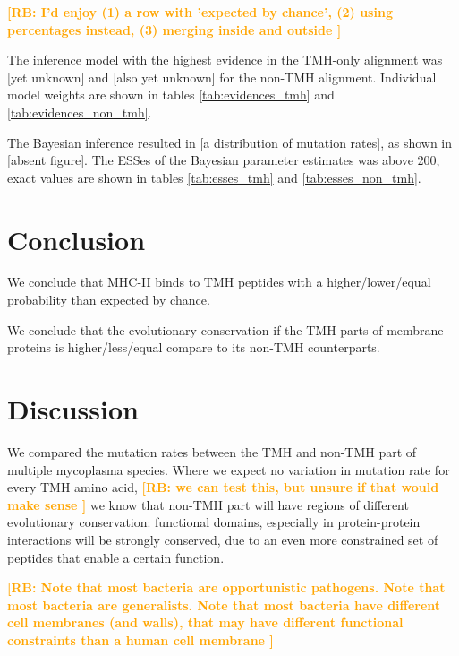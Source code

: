 \documentclass{article}
\newcommand{\richel}[1]{\textcolor{orange}{\textbf{[RB: #1]}}}
\begin{document}
	
	\richel{
	  I'd enjoy 
	  (1) a row with 'expected by chance', 
	  (2) using percentages instead,
	  (3) merging inside and outside
	}

	The inference model with the highest evidence in the
	TMH-only alignment was [yet unknown] and [also yet unknown]
	for the non-TMH alignment. Individual model weights are shown
	in tables \ref{tab:evidences_tmh} 
	and \ref{tab:evidences_non_tmh}.

	The Bayesian inference resulted in [a distribution of mutation rates],
	as shown in [absent figure].
	The ESSes of the Bayesian parameter estimates was above 200, exact values
	are shown in tables \ref{tab:esses_tmh} and \ref{tab:esses_non_tmh}.
\fi

\section{Conclusion}

We conclude that MHC-II binds to TMH peptides with a higher/lower/equal
probability than expected by chance. 

We conclude that the evolutionary conservation if the TMH parts of membrane
proteins is higher/less/equal compare to its non-TMH counterparts.

\section{Discussion}

We compared the mutation rates between the TMH and non-TMH part of
multiple mycoplasma species. Where we expect no variation 
in mutation rate for every TMH amino acid,
\richel{
  we can test this, but unsure if that would make sense
}
we know that non-TMH part will have regions of different evolutionary
conservation: functional domains, especially in protein-protein
interactions will be strongly conserved, due to an even more constrained
set of peptides that enable a certain function.

\richel{
  Note that most bacteria are opportunistic pathogens.
  Note that most bacteria are generalists.
  Note that most bacteria have different cell membranes (and walls), that
  may have different functional constraints than a human cell membrane
}
\end{document}
